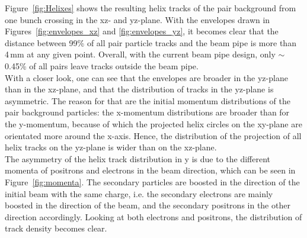 Figure~\ref{fig:Helixes} shows the resulting helix tracks of the pair background from one bunch crossing in the xz- and yz-plane.
With the envelopes drawn in Figures~\ref{fig:envelopes_xz} and \ref{fig:envelopes_yz}, it becomes clear that the distance between 99\% of all pair particle tracks and the beam pipe is more than \unit{4}\,{mm} at any given point.
Overall, with the current beam pipe design, only $\sim$ 0.45\% of all pairs leave tracks outside the beam pipe.\\
With a closer look, one can see that the envelopes are broader in the yz-plane than in the xz-plane, and that the distribution of tracks in the yz-plane is asymmetric.
The reason for that are the initial momentum distributions of the pair background particles: the x-momentum distributions are broader than for the y-momentum, because of which the projected helix circles on the xy-plane are orientated more around the x-axis.
Hence, the distribution of the projection of all helix tracks on the yz-plane is wider than on the xz-plane.\\
The asymmetry of the helix track distribution in y is due to the different momenta of positrons and electrons in the beam direction, which can be seen in Figure~\ref{fig:momenta}.
The secondary particles are boosted in the direction of the initial beam with the same charge, i.e. the secondary electrons are mainly boosted in the direction of the \Pem beam, and the secondary positrons in the other direction accordingly.
Looking at both electrons and positrons, the distribution of track density becomes clear.


